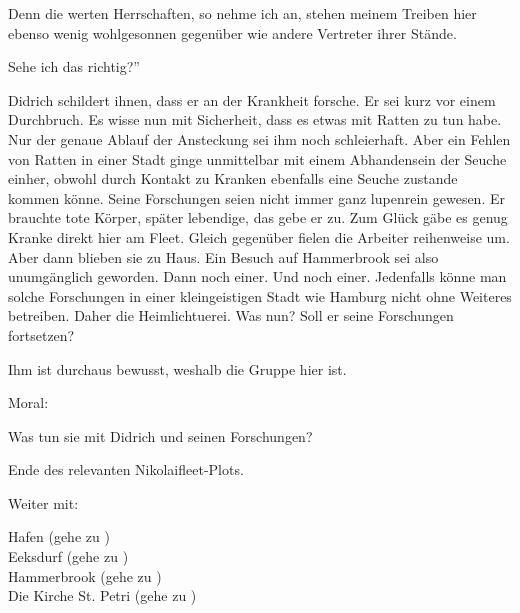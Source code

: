 Denn die werten Herrschaften, so nehme ich an, stehen meinem Treiben hier ebenso wenig wohlgesonnen gegenüber wie andere Vertreter ihrer Stände.

Sehe ich das richtig?”

Didrich schildert ihnen, dass er an der Krankheit forsche. Er sei kurz vor einem Durchbruch. Es wisse nun mit Sicherheit, dass es etwas mit Ratten zu tun habe. Nur der genaue Ablauf der Ansteckung sei ihm noch schleierhaft. Aber ein Fehlen von Ratten in einer Stadt ginge unmittelbar mit einem Abhandensein der Seuche einher, obwohl durch Kontakt zu Kranken ebenfalls eine Seuche zustande kommen könne. Seine Forschungen seien nicht immer ganz lupenrein gewesen. Er brauchte tote Körper, später lebendige, das gebe er zu. Zum Glück gäbe es genug Kranke direkt hier am Fleet. Gleich gegenüber fielen die Arbeiter reihenweise um. Aber dann blieben sie zu Haus. Ein Besuch auf Hammerbrook sei also unumgänglich geworden. Dann noch einer. Und noch einer. Jedenfalls könne man solche Forschungen in einer kleingeistigen Stadt wie Hamburg nicht ohne Weiteres betreiben. Daher die Heimlichtuerei. Was nun? Soll er seine Forschungen fortsetzen?

Ihm ist durchaus bewusst, weshalb die Gruppe hier ist.


Moral:

Was tun sie mit Didrich und seinen Forschungen?

Ende des relevanten Nikolaifleet-Plots.

Weiter mit:

Hafen (gehe zu \blue{\ref{Hafen}}) \\
Eeksdurf (gehe zu \blue{\ref{xd}}) \\
Hammerbrook (gehe zu \blue{\ref{arm}}) \\
Die Kirche St. Petri (gehe zu \blue{\ref{Petri}}) \\
